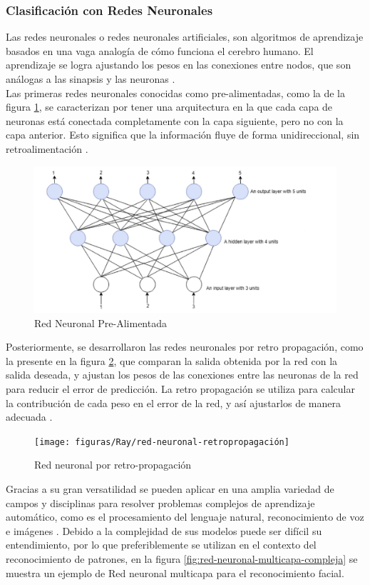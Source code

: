 \subsubsection{Clasificación con Redes Neuronales}
Las redes neuronales o redes neuronales artificiales, son algoritmos de aprendizaje basados en una vaga analogía de cómo funciona el cerebro humano. El aprendizaje se logra ajustando los pesos en las conexiones entre nodos, que son análogas a las sinapsis y las neuronas \citep{sammut2011encyclopedia}. \\
Las primeras redes neuronales conocidas como pre-alimentadas, como la de la figura \ref{fig:red-neuronal-prealimentada}, se caracterizan por tener una arquitectura en la que cada capa de neuronas está conectada completamente con la capa siguiente, pero no con la capa anterior. Esto significa que la información fluye de forma unidireccional, sin retroalimentación \citep{abiodun2018state}. 
\begin{figure}[H]
	\centering
	\includegraphics[width=0.7\linewidth]{figuras/Ray/red-neuronal-prealimentada}
	\caption{Red Neuronal Pre-Alimentada \citep{abiodun2018state}}
	\label{fig:red-neuronal-prealimentada}
\end{figure}
Posteriormente, se desarrollaron las redes neuronales por retro propagación, como la presente en la figura \ref{fig:red-neuronal-retropropagacion}, que comparan la salida obtenida por la red con la salida deseada, y ajustan los pesos de las conexiones entre las neuronas de la red para reducir el error de predicción. La retro propagación se utiliza para calcular la contribución de cada peso en el error de la red, y así ajustarlos de manera adecuada \citep{abiodun2018state}.
\begin{figure}[H]
	\centering
	\texttt{[image: figuras/Ray/red-neuronal-retropropagación]}
	\caption{Red neuronal por retro-propagación \citep{abiodun2018state}}
	\label{fig:red-neuronal-retropropagacion}
\end{figure}
Gracias a su gran versatilidad se pueden aplicar en una amplia variedad de campos y disciplinas para resolver problemas complejos de aprendizaje automático, como es el procesamiento del lenguaje natural, reconocimiento de voz e imágenes \citep{abiodun2018state}. Debido a la complejidad de sus modelos puede ser difícil su entendimiento, por lo que preferiblemente se utilizan en el contexto del reconocimiento de patrones, en la figura \ref{fig:red-neuronal-multicapa-compleja} se muestra un ejemplo de Red neuronal multicapa para el reconocimiento facial.
